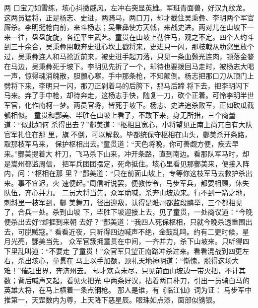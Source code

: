 两
口宝刀如雪练，垓心抖擞威风，左冲右突显英雄。军班青面兽，好汉九纹龙。
这两员猛将，正是杨志、史进，两骑马，两口刀，却才截住吴秉彝、李明两个军官
厮杀。李明挺枪向前，来斗杨志；吴秉彝使方天戟，来战史进。两对儿在山坡下一
来一往，盘盘旋旋，各逞平生武艺。童贯在山坡上勒住马，观之不定。四个人约斗
到三十余合，吴秉彝用戟奔史进心坎上戳将来，史进只一闪，那枝戟从肋窝里放个
过，吴秉彝连人和马抢近前来，被史进手起刀落，只见一条血颡光连肉，顿落金鍪
在马边，吴秉彝死于坡下。李明见先折了一个，却待也要拨回马走时，被杨志大喝
一声，惊得魂消魄散，胆颤心寒，手中那条枪，不知颠倒。杨志把那口刀从顶门上
劈将下来，李明只一闪，那刀正剁着马的后胯下，那马后蹄将下去，把李明闪下
马来。弃了手中枪，却待奔走，这杨志手快，随复一刀，砍个正着。可怜李明半世
军官，化作南柯一梦。两员官将，皆死于坡下。杨志、史进追杀败军，正如砍瓜截
瓠相似。
童贯和酆美、毕胜在山坡上看了，不敢下来，身无所措，三个商量道：“似此如何
杀得出去？”酆美道：“枢相且宽心，小将望见正南上尚兀自有大队官军扎住在那
里，旗不倒，可以解救。毕都统保守枢相在山头，酆美杀开条路，取那枝军马来，
保护枢相出去。”童贯道：“天色将晚，你可善觑方便，疾去早来。”酆美提着大
杆刀，飞马杀下山来，冲开条路，直到南边。看那队军马时，却是嵩州都监周信，
把军兵团团摆定，死命抵住。垓心里看见那酆美来，便接入阵内，问：“枢相在那
里？”酆美道：“只在前面山坡上，专等你这枝军马去救护杀出来。事不宜迟，火
速便起。”周信听说罢，便教传令，马步军兵，都要相顾，休失队伍，齐心并力。
二员大将当先，众军助喊，杀奔山坡边来。行不到一箭之地，刺斜里一枝军到，酆
美舞刀，径出迎敌，认得是睢州都监段鹏举，三个都相见了，合兵一处。杀到山坡
下，毕胜下坡迎接上去，见了童贯，一处商议道：“今晚便杀出去好?却捱到来朝
去好？”酆美道：“我四人死保枢相，只就今晚杀透重围出去，可脱贼寇。”
看看近夜，只听得四边喊声不绝，金鼓乱鸣。约有二更时候，星月光亮，酆美当先，
众军官簇拥童贯在中间，一齐并力，杀下山坡来。只听得四下里乱叫道：“不要走
了童贯！”众官军只望正南路冲杀过来。看看混战到四更左右，杀出垓心，童贯在
马上以手加额，顶礼天地神明道：“惭愧，脱得这场大难！”催赶出界，奔济州去。
却才欢喜未尽，只见前面山坡边一带火把，不计其数；背后喊声又起，看见火把光
中两条好汉，拈着两口朴刀，引出一员骑白马的英雄大将，在马上横着一条点钢枪。
那人是谁，有《临江仙》词为证：
马步军中推第一，天罡数内为尊，上天降下恶星辰。眼珠如点漆，面部似镌银。

